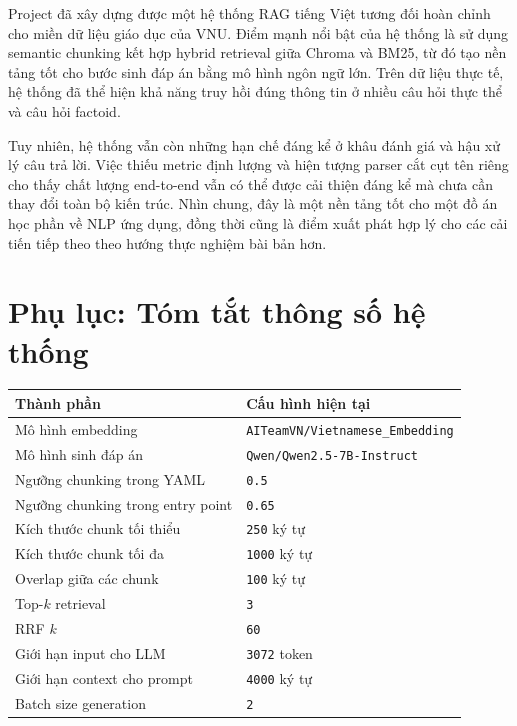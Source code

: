 \documentclass[12pt,a4paper]{article}
\begin{document}
Project đã xây dựng được một hệ thống RAG tiếng Việt tương đối hoàn chỉnh cho miền dữ liệu giáo dục của VNU. Điểm mạnh nổi bật của hệ thống là sử dụng semantic chunking kết hợp hybrid retrieval giữa Chroma và BM25, từ đó tạo nền tảng tốt cho bước sinh đáp án bằng mô hình ngôn ngữ lớn. Trên dữ liệu thực tế, hệ thống đã thể hiện khả năng truy hồi đúng thông tin ở nhiều câu hỏi thực thể và câu hỏi factoid.

Tuy nhiên, hệ thống vẫn còn những hạn chế đáng kể ở khâu đánh giá và hậu xử lý câu trả lời. Việc thiếu metric định lượng và hiện tượng parser cắt cụt tên riêng cho thấy chất lượng end-to-end vẫn có thể được cải thiện đáng kể mà chưa cần thay đổi toàn bộ kiến trúc. Nhìn chung, đây là một nền tảng tốt cho một đồ án học phần về NLP ứng dụng, đồng thời cũng là điểm xuất phát hợp lý cho các cải tiến tiếp theo theo hướng thực nghiệm bài bản hơn.

\section*{Phụ lục: Tóm tắt thông số hệ thống}

\begin{longtable}{p{} p{}}
\toprule
\textbf{Thành phần} & \textbf{Cấu hình hiện tại} \\
\midrule
Mô hình embedding & \texttt{AITeamVN/Vietnamese\_Embedding} \\
Mô hình sinh đáp án & \texttt{Qwen/Qwen2.5-7B-Instruct} \\
Ngưỡng chunking trong YAML & \texttt{0.5} \\
Ngưỡng chunking trong entry point & \texttt{0.65} \\
Kích thước chunk tối thiểu & \texttt{250} ký tự \\
Kích thước chunk tối đa & \texttt{1000} ký tự \\
Overlap giữa các chunk & \texttt{100} ký tự \\
Top-\(k\) retrieval & \texttt{3} \\
RRF \(k\) & \texttt{60} \\
Giới hạn input cho LLM & \texttt{3072} token \\
Giới hạn context cho prompt & \texttt{4000} ký tự \\
Batch size generation & \texttt{2} \\
\bottomrule
\end{longtable}
\end{document}
